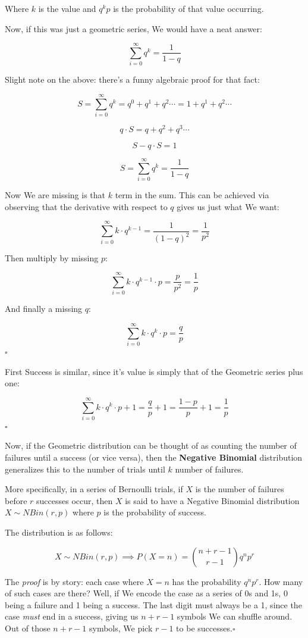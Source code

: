 \documentclass{article}
\newcommand{\qed}{\hfill$\square$}
\begin{document}
		Where $k$ is the value and $q^kp$ is the probability of that value occurring.
		
		Now, if this was just a geometric series, We would have a neat answer:
		
		$$\sum^\infty_{i=0}q^k = \frac{1}{1-q}$$
		
		Slight note on the above: there's a funny algebraic proof for that fact:
		
		$$S = \sum^\infty_{i=0}q^k = q^0 + q^1 + q^2 \cdots = 1 + q^1 + q^2 \cdots$$
		
		$$q\cdot S = q + q^2 + q^3 \cdots $$
		
		$$S - q\cdot S = 1$$
		
		$$S = \sum^\infty_{i=0}q^k = \frac{1}{1-q}$$
		
		Now We are missing is that $k$ term in the sum. This can be achieved via observing that the derivative with respect to $q$ gives us just what We want:
		
		$$\sum^\infty_{i=0}k\cdot q^{k-1} = \frac{1}{(1-q)^2} = \frac{1}{p^2}$$
		
		Then multiply by missing $p$:
		
		$$\sum^\infty_{i=0}k\cdot q^{k-1} \cdot p = \frac{p}{p^2} = \frac{1}{p}$$
		
		And finally a missing $q$:
		
		$$\sum^\infty_{i=0}k\cdot q^{k} \cdot p = \frac{q}{p}$$ \qed
		
		First Success is similar, since it's value is simply that of the Geometric series plus one:
		
		$$\sum^\infty_{i=0}k\cdot q^{k} \cdot p + 1 = \frac{q}{p} + 1 = \frac{1-p}{p} + 1 = \frac{1}{p}	$$\qed
		
		Now, if the Geometric distribution can be thought of as counting the number of failures until a success (or vice versa), then the \textbf{Negative Binomial} distribution generalizes this to the number of trials until $k$ number of failures.
		
		More specifically, in a series of Bernoulli trials, if $X$ is the number of failures before $r$ successes occur, then $X$ is said to have a Negative Binomial distribution $X \sim NBin(r, p)$ where $p$ is the probability of success.
		
		The distribution is as follows: 
		
		$$X \sim NBin(r, p) \implies P(X = n) = {n + r - 1 \choose r - 1}q^np^r$$ 
		
		The \textit{proof} is by story: each case where $X = n$ has the probability $q^np^r$. How many of such cases are there? Well, if We encode the case as a series of 0s and 1s, 0 being a failure and 1 being a success. The last digit must always be a 1, since the case \textit{must} end in a success, giving us $n + r - 1$ symbols We can shuffle around. Out of those $n + r - 1$ symbols, We pick $r-1$ to be successes.\qed
		
\end{document}
